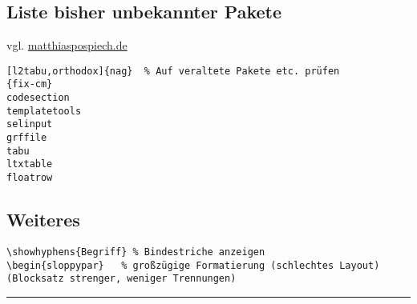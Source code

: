 \subsection{Liste bisher unbekannter Pakete}
vgl. \url{matthiaspospiech.de}
\begin{verbatim}
[l2tabu,orthodox]{nag}	% Auf veraltete Pakete etc. prüfen
{fix-cm}
codesection
templatetools
selinput
grffile
tabu
ltxtable
floatrow
\end{verbatim}

\subsection{Weiteres}
\begin{lstlisting}
\showhyphens{Begriff} % Bindestriche anzeigen
\begin{sloppypar}	% großzügige Formatierung (schlechtes Layout)  (Blocksatz strenger, weniger Trennungen)
\end{lstlisting}	

\newpage
\qquad



\hrule \vspace{0.5\baselineskip}
